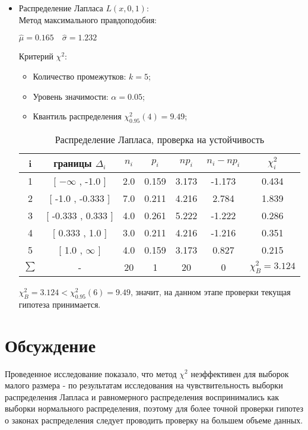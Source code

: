 \documentclass[12pt,a4paper]{article}
\begin{document}
\begin{itemize}
					\newpage
					\item Распределение Лапласа $L(x, 0, 1)$:\\
					Метод максимального правдоподобия:
					\begin{center}
						$\hat{\mu}=0.165 \quad \hat{\sigma} = 1.232$
					\end{center}
					Критерий $\chi^2:$
					\begin{itemize}
						\item Количество промежутков: $k=5$;
						\item Уровень значимости: $\alpha=0.05$;
						\item Квантиль распределения $\chi^2_{0.95}(4)=9.49$;
					\end{itemize}
				
					\FloatBarrier
					\begin{table}[h!]
						\begin{center}
							\begin{tabular}{|c|c|c|c|c|c|c|}
								\hline
								i & границы $\Delta_i$ & $n_i$ & $p_i$ & $np_i$ & $n_i-np_i$ & $\chi_i^2$ \\ \hline
								1 & [ $-\infty$ , -1.0 ] & 2.0 & 0.159 & 3.173 & -1.173 & 0.434 \\ \hline
								2 & [ -1.0 , -0.333 ] & 7.0 & 0.211 & 4.216 & 2.784 & 1.839 \\ \hline
								3 & [ -0.333 , 0.333 ] & 4.0 & 0.261 & 5.222 & -1.222 & 0.286 \\ \hline
								4 & [ 0.333 , 1.0 ] & 3.0 & 0.211 & 4.216 & -1.216 & 0.351 \\ \hline
								5 & [ 1.0 , $\infty$ ] & 4.0 & 0.159 & 3.173 & 0.827 & 0.215 \\ \hline
								$\sum$ & - & 20 & 1 & 20 & 0 & $\chi_B^2=3.124$ \\ \hline
							\end{tabular}
						\caption{Распределение Лапласа, проверка на устойчивость}
						\end{center}
					\end{table}
					\FloatBarrier
					
					$\chi_B^2 = 3.124 <  \chi^2_{0.95}(6)=9.49$, значит, на данном этапе проверки текущая гипотеза принимается.
				\end{itemize}
		\newpage
		\clearpage
	\section{Обсуждение}
	Проведенное исследование показало, что метод $\chi^2$ неэффективен для выборок малого размера - по результатам исследования на чувствительность выборки распределения Лапласа и равномерного распределения воспринимались как выборки нормального распределения, поэтому для более точной проверки гипотез о законах распределения следует проводить проверку на большем объеме данных.
	\newpage
			
\end{document}
